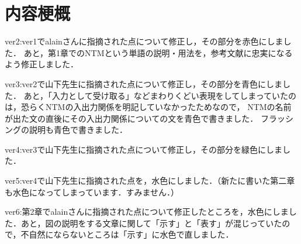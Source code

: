 \chapter*{内容梗概}
ver2:ver1でalainさんに指摘された点について修正し，その部分を赤色にしました．
あと，第1章でのNTMという単語の説明・用法を，参考文献に忠実になるよう修正しました．

ver3:ver2で山下先生に指摘された点について修正し，その部分を青色にしました．
あと，「入力として受け取る」などまわりくどい表現をしてしまっていたのは，恐らくNTMの入出力関係を明記していなかったためなので，
NTMの名前が出た文の直後にその入出力関係についての文を青色で書きました．
フラッシングの説明も青色で書きました．

ver4:ver3で山下先生に指摘された点について修正し，その部分を緑色にしました．

ver5:ver4で山下先生に指摘された点を，水色にしました．（新たに書いた第二章も水色になってしまっています．すみません．）

ver6:第2章でalainさんに指摘された点について修正したところを，水色にしました．あと，図の説明をする文章に関して「示す」と「表す」が混じっていたので，不自然にならないところは「示す」に水色で直しました．
